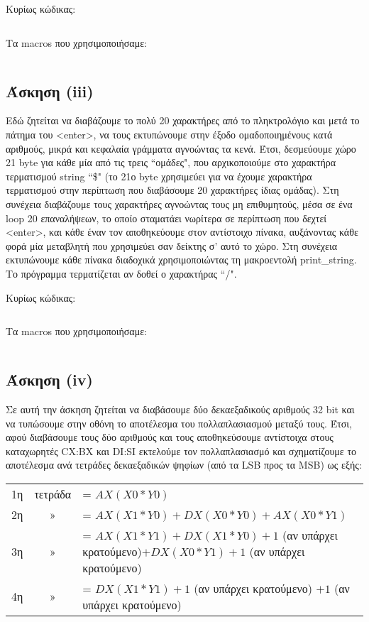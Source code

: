 \documentclass[a4paper,10pt]{article} \usepackage{anysize}
\begin{document}
\noindent Κυρίως κώδικας:
\inputminted[linenos,obeytabs,fontsize=\footnotesize]{nasm}{files/2.asm}
Τα macros που χρησιμοποιήσαμε:
\inputminted[linenos,obeytabs,fontsize=\footnotesize]{nasm}{files/2.txt}
\subsection*{Άσκηση (iii)}
Εδώ ζητείται να διαβάζουμε το πολύ 20 χαρακτήρες από το πληκτρολόγιο
και μετά το πάτημα του <enter>, να τους εκτυπώνουμε
στην έξοδο ομαδοποιημένους κατά αριθμούς, μικρά και κεφαλαία γράμματα
αγνοώντας τα κενά. Έτσι, δεσμεύουμε χώρο 21 byte για κάθε μία από τις τρεις
``ομάδες", που αρχικοποιούμε στο χαρακτήρα τερματισμού string ``\$" (το 21ο byte
χρησιμεύει για να έχουμε χαρακτήρα τερματισμού στην περίπτωση που διαβάσουμε
20 χαρακτήρες ίδιας ομάδας).  Στη συνέχεια διαβάζουμε τους χαρακτήρες
αγνοώντας τους μη επιθυμητούς, μέσα σε ένα loop 20 επαναλήψεων, 
το οποίο σταματάει νωρίτερα σε περίπτωση που δεχτεί <enter>, 
και κάθε έναν τον αποθηκεύουμε στον αντίστοιχο πίνακα,
αυξάνοντας κάθε φορά μία μεταβλητή που χρησιμεύει σαν δείκτης σ' αυτό το χώρο.
Στη συνέχεια εκτυπώνουμε κάθε πίνακα διαδοχικά χρησιμοποιώντας τη
μακροεντολή print\_string. Το πρόγραμμα τερματίζεται αν δοθεί ο χαρακτήρας ``/".

\noindent Κυρίως κώδικας:
\inputminted[linenos,obeytabs,fontsize=\footnotesize]{nasm}{files/3.asm}
Τα macros που χρησιμοποιήσαμε:
\inputminted[linenos,obeytabs,fontsize=\footnotesize]{nasm}{files/3.txt}
\subsection*{Άσκηση (iv)}
Σε αυτή την άσκηση ζητείται να διαβάσουμε δύο δεκαεξαδικούς αριθμούς 32 bit
και να τυπώσουμε στην οθόνη το αποτέλεσμα του πολλαπλασιασμού μεταξύ τους.
Έτσι, αφού διαβάσουμε τους δύο αριθμούς και τους αποθηκεύσουμε αντίστοιχα
στους καταχωρητές CX:BX και DI:SI  εκτελούμε τον πολλαπλασιασμό και
σχηματίζουμε το αποτέλεσμα ανά τετράδες δεκαεξαδικών ψηφίων (από τα LSB προς
τα MSB) ως εξής:

\begin{tabular}{l c l}
1η & τετράδα & = $AX(X0*Y0)$\\
2η & » & =  $AX(X1*Y0)+ DX(X0*Y0) + AX(X0*Y1)$\\
3η & » & = \parbox{13cm}{$AX(X1*Y1) + DX(X1*Y0) + 1$ (αν υπάρχει κρατούμενο)$ +  DX(X0*Y1) +
1$ (αν υπάρχει κρατούμενο)}\\
4η & » & = $DX(X1*Y1) + 1$ (αν υπάρχει κρατούμενο) $+ 1$ (αν υπάρχει κρατούμενο)\\
\end{tabular}
\end{document}
